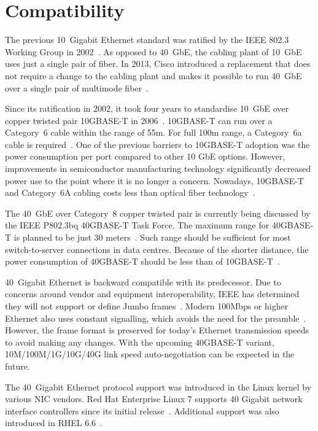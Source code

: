 
\section{Compatibility}\label{sec:40gbe-compatibility}
The previous 10~Gigabit Ethernet standard was ratified by the IEEE 802.3 Working Group in 2002~\cite{ieee-802.3ae}.
As opposed to 40~GbE, the cabling plant of 10~GbE uses just a single pair of fiber.
In 2013, Cisco introduced a replacement that does not require a change to the cabling plant
and makes it possible to run 40~GbE over a single pair of multimode fiber~\cite{40gbe-mmf}.

Since its ratification in 2002,
it took four years to standardise 10~GbE over copper twisted pair 10GBASE-T in 2006~\cite{ieee-802.3an}.
10GBASE-T can run over a Category~6 cable within the range of 55m.
For full 100m range, a Category~6a cable is required~\cite{ieee-802.3an}.
One of the previous barriers to 10GBASE-T adoption was the power consumption per port compared to other 10 GbE options.
However, improvements in semiconductor manufacturing technology
significantly decreased power use to the point where it is no longer a concern.
Nowadays, 10GBASE-T and Category~6A cabling costs less than optical fiber technology~\cite{belden-10g-40g}.

The 40~GbE over Category~8 copper twisted pair
is currently being discussed by the IEEE P802.3bq 40GBASE-T Task Force.
The maximum range for 40GBASE-T is planned to be just 30 meters~\cite{ieee-802.3bq}.
Such range should be sufficient for most switch-to-server connections in data centres.
Because of the shorter distance, the power consumption of 40GBASE-T should be less than of 10GBASE-T~\cite{belden-10g-40g}.

40~Gigabit Ethernet is backward compatible with its predecessor.
Due to concerns around vendor and equipment interoperability,
IEEE has determined they will not support or define Jumbo frames~\cite{ea-jumbo-frames}.
Modern 100Mbps or higher Ethernet also uses constant signalling, which avoids the need for the preamble~\cite{anatomy-frame}.
However, the frame format is preserved for today's Ethernet transmission speeds to avoid making any changes.
With the upcoming 40GBASE-T variant, 10M/100M/1G/10G/40G link speed auto-negotiation can be expected in the future.

The 40~Gigabit Ethernet protocol support was introduced in the Linux kernel by various NIC vendors.
Red Hat Enterprise Linux 7 supports 40 Gigabit network interface controllers since its initial release~\cite{rhel-7-announce}.
Additional support was also introduced in RHEL 6.6~\cite{rhel-66-announce}.

